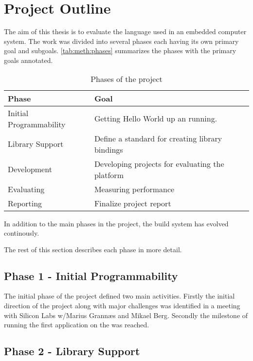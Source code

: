 \section{Project Outline}
\label{sec:project-outline}

The aim of this thesis is to evaluate the {\rust} language used in an embedded computer system.
The work was divided into several phases each having its own primary goal and subgoals.
\autoref{tab:meth:phases} summarizes the phases with the primary goals annotated.

\begin{table}[H]
  \begin{center}
    \begin{tabular}{l|l}
      \textbf{Phase}&\textbf{Goal} \\
      \hline
      Initial Programmability & Getting Hello World up an running.\\
      Library Support & Define a standard for creating library bindings\\
      Development & Developing projects for evaluating the platform\\
      Evaluating & Measuring performance\\
      Reporting & Finalize project report\\
      \hline
    \end{tabular}
  \end{center}
  \caption{Phases of the project}
  \label{tab:meth:phases}
\end{table}

In addition to the main phases in the project, the build system has evolved continously.

The rest of this section describes each phase in more detail.

\subsection{Phase 1 - Initial Programmability}
The initial phase of the project defined two main activities.
Firstly the initial direction of the project along with major challenges was identified in a meeting with Silicon Labs w/Marius Grannæs and Mikael Berg.
Secondly the milestone of running the first {\rust} application on the {\gecko} was reached.


\subsection{Phase 2 - Library Support}

